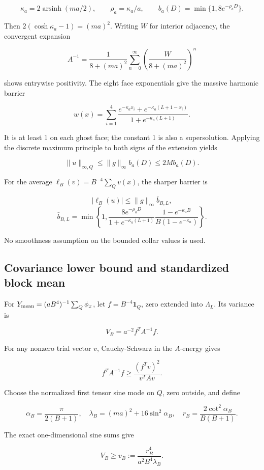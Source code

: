 \documentclass[
  11pt,
  letterpaper,
]{article}
\begin{document}
\[
\kappa_a=2\operatorname{arsinh}(ma/2),\qquad
\rho_a=\kappa_a/a,\qquad
b_a(D)=\min\{1,8e^{-\rho_aD}\}.
\]

Then \(2(\cosh\kappa_a-1)=(ma)^2\). Writing \(W\) for interior
adjacency, the convergent expansion

\[
A^{-1}=\frac1{8+(ma)^2}\sum_{n=0}^{\infty}
\left(\frac{W}{8+(ma)^2}\right)^n
\]

shows entrywise positivity. The eight face exponentials give the massive
harmonic barrier

\[
w(x)=\sum_{i=1}^4
\frac{e^{-\kappa_a x_i}+e^{-\kappa_a(L+1-x_i)}}
{1+e^{-\kappa_a(L+1)}}.
\]

It is at least 1 on each ghost face; the constant 1 is also a
supersolution. Applying the discrete maximum principle to both signs of
the extension yields

\[
\|u\|_{\infty,Q}\le\|g\|_\infty b_a(D)\le2M b_a(D).
\tag{G1}
\]

For the average \(\ell_B(v)=B^{-4}\sum_Qv(x)\), the sharper barrier is

\[
|\ell_B(u)|\le\|g\|_\infty\bar b_{B,L},
\] \[
\bar b_{B,L}=\min\left\{1,
\frac{8e^{-\rho_aD}}{1+e^{-\kappa_a(L+1)}}
\frac{1-e^{-\kappa_a B}}{B(1-e^{-\kappa_a})}\right\}.
\]

No smoothness assumption on the bounded collar values is used.

\subsection{Covariance lower bound and standardized block
mean}\label{covariance-lower-bound-and-standardized-block-mean}

For \(Y_{\rm mean}=(aB^4)^{-1}\sum_Q\phi_x\), let
\(f=B^{-4}\mathbf1_Q\), zero extended into \(\Lambda_L\). Its variance
is

\[
V_B=a^{-2}f^TA^{-1}f.
\]

For any nonzero trial vector \(v\), Cauchy-Schwarz in the \(A\)-energy
gives

\[
f^TA^{-1}f\ge\frac{(f^Tv)^2}{v^TAv}.
\]

Choose the normalized first tensor sine mode on \(Q\), zero outside, and
define

\[
\alpha_B=\frac{\pi}{2(B+1)},\quad
\lambda_B=(ma)^2+16\sin^2\alpha_B,\quad
r_B=\frac{2\cot^2\alpha_B}{B(B+1)}.
\]

The exact one-dimensional sine sums give

\[
V_B\ge v_B:=\frac{r_B^4}{a^2B^4\lambda_B}.
\]
\end{document}
